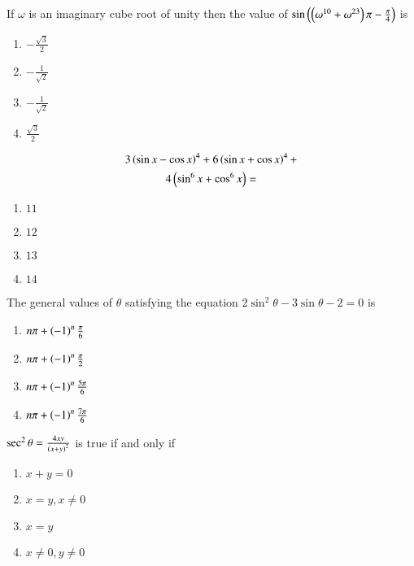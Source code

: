     \item If $\omega$ is an imaginary cube root of unity then the value of $\sin{\ensuremath{\left(\left(\omega^{10} + \omega^{23}\right)\pi - \frac{\pi}{4}\right)}}$ is
    
        \hfill{}
        \begin{enumerate}
                \item $-\frac{\sqrt{3}}{2}$
                \item $-\frac{1}{\sqrt{2}}$
                \item $-\frac{1}{\sqrt{2}}$
                \item $\frac{\sqrt{3}}{2}$
        \end{enumerate}

	\item \begin{multline*}
		3\left(\sin{x} - \cos{x}\right)^4 + 6\left(\sin{x} + \cos{x}\right)^4 + \\ 4\left(\sin^6{x}+\cos^6{x}\right) =
	\end{multline*}
        
        \hfill{}
        \begin{enumerate}
                \item $11$
                \item $12$
                \item $13$
                \item $14$
        \end{enumerate}   

    \item The general values of $\theta$ satisfying the equation $2\sin^2{\theta}-3\sin{\theta}-2=0$ is
        
        \hfill{}
        \begin{enumerate}
                \item $n\pi + \left(-1\right)^n\frac{\pi}{6}$
                \item $n\pi + \left(-1\right)^n\frac{\pi}{2}$
                \item $n\pi + \left(-1\right)^n\frac{5\pi}{6}$ 
                \item $n\pi + \left(-1\right)^n\frac{7\pi}{6}$
        \end{enumerate}

    \item $\sec^2{\theta} = \frac{4xy}{\left(x+y\right)^2}$ is true if and only if
        
        \hfill{}
        \begin{enumerate}
                \item $x+y=0$
                \item $x=y,x\neq0$
                \item $x=y$ 
                \item $x\neq0,y\neq0$
        \end{enumerate}
        

